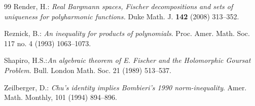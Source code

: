 \documentclass[12pt]{amsart}
\begin{document}
\begin{thebibliography}{99}
Render, H.:  {\em Real Bargmann spaces, Fischer decompositions and
sets of uniqueness for polyharmonic functions.} Duke Math. J. \textbf{142}  (2008)
313--352.


Reznick, B.: {\em An inequality for products of polynomials}. Proc.
Amer. Math. Soc. 117  no. 4 (1993) 1063--1073.

 Shapiro, H.S.:\emph{An algebraic theorem of E. Fischer and
the Holomorphic Goursat Problem}. Bull. London Math. Soc. 21 (1989) 513--537.




 Zeilberger, D.: \emph{Chu's identity implies Bombieri's 1990
norm-inequality}. Amer. Math. Monthly, 101 (1994) 894--896.
\end{thebibliography}
\end{document}
